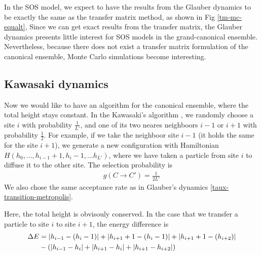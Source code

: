 In the SOS model, we expect to have the results from the Glauber dynamics to be exactly the same as the transfer matrix method, as shown in Fig \ref{tm-mc-equalt}, Since we can get exact results from the transfer matrix, the Glauber dynamics presents little interest for SOS models in the grand-canonical ensemble. Nevertheless, because there does not exist a transfer matrix formulation of the canonical ensemble, Monte Carlo simulations become interesting.

    \subsection{Kawasaki dynamics}

Now we would like to have an algorithm for the canonical ensemble, where the total height stays constant. In the Kawasaki's algorithm \cite{kawasaki_diffusion_1966}, we randomly choose a site $i$ with probability $\frac{1}{L'}$, and one of its two neares neighboors $i-1$ or $i+1$ with probability $\frac{1}{2}$. For example, if we take the neighboor site $i-1$ (it holds the same for the site $i+1$), we generate a new configuration with Hamiltonian $H(h_0,...,h_{i-1}+1,h_i-1,...h_{L'})$, where we have taken a particle from site $i$ to diffuse it to the other site.
The selection probability is
\begin{align}
    g(C\to C') = \frac{1}{2L'}
\end{align}
We also chose the same acceptance rate as in Glauber's dynamics \eqref{taux-transition-metropolis}.

Here, the total height is obvisouly conserved. In the case that we transfer a particle to site $i$ to site $i+1$, the energy difference is
\begin{align}
	\Delta E &= |h_{i-1}-(h_i - 1)| + |h_{i+1} + 1 -(h_i- 1)| + |h_{i+1} + 1-(h_{i+2} )|  \nonumber \\
	& - \left( |h_{i-1}-h_i| + |h_{i+1} -h_i| + |h_{i+1}-h_{i+2}| \right)
\end{align}

